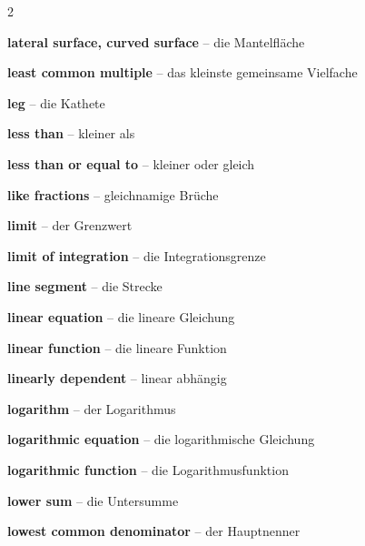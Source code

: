 \begin{multicols}{2}
\par\nopagebreak
\textbf{lateral surface, curved surface} -- die Mantelfläche\dotfill\hyperref[e:250]{\pageref*{e:250}}\par
\textbf{least common multiple} -- das kleinste gemeinsame Vielfache\dotfill\hyperref[e:57]{\pageref*{e:57}}\par
\textbf{leg} -- die Kathete\dotfill\hyperref[e:187]{\pageref*{e:187}}\par
\textbf{less than} -- kleiner als\dotfill\hyperref[e:63]{\pageref*{e:63}}\par
\textbf{less than or equal to} -- kleiner oder gleich\dotfill\hyperref[e:65]{\pageref*{e:65}}\par
\textbf{like fractions} -- gleichnamige Brüche\dotfill\hyperref[e:34]{\pageref*{e:34}}\par
\textbf{limit} -- der Grenzwert\dotfill\hyperref[e:264]{\pageref*{e:264}}\par
\textbf{limit of integration} -- die Integrationsgrenze\dotfill\hyperref[e:297]{\pageref*{e:297}}\par
\textbf{line segment} -- die Strecke\dotfill\hyperref[e:148]{\pageref*{e:148}}\par
\textbf{linear equation} -- die lineare Gleichung\dotfill\hyperref[e:81]{\pageref*{e:81}}\par
\textbf{linear function} -- die lineare Funktion\dotfill\hyperref[e:119]{\pageref*{e:119}}\par
\textbf{linearly dependent} -- linear abhängig\dotfill\hyperref[e:319]{\pageref*{e:319}}\par
\textbf{logarithm} -- der Logarithmus\dotfill\hyperref[e:95]{\pageref*{e:95}}\par
\textbf{logarithmic equation} -- die logarithmische Gleichung\dotfill\hyperref[e:85]{\pageref*{e:85}}\par
\textbf{logarithmic function} -- die Logarithmusfunktion\dotfill\hyperref[e:131]{\pageref*{e:131}}\par
\textbf{lower sum} -- die Untersumme\dotfill\hyperref[e:294]{\pageref*{e:294}}\par
\textbf{lowest common denominator} -- der Hauptnenner\dotfill\hyperref[e:36]{\pageref*{e:36}}\par


\end{multicols}
